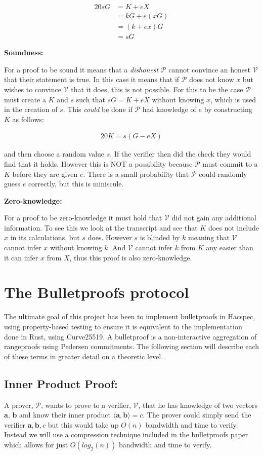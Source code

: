 \documentclass{article}
\newcommand{\eq}[1]{\begin{alignat*}{20}#1\end{alignat*}}
\renewcommand{\vec}[1]{\boldsymbol{#1}}
\newcommand{\V}{\mathcal{V}}
\renewcommand{\P}{\mathcal{P}}
\newcommand{\dotp}[2]{\langle #1, #2 \rangle}
\begin{document}
\eq{
	sG &= K + eX \\
	   &= kG + e(xG) \\
	   &= (k + ex)G \\
	   &= sG
}

\textbf{Soundness:}

For a proof to be sound it means that a \textit{dishonest} $\P$
cannot convince an honest $\V$ that their statement is true. In this
case it means that if $\P$ does not know $x$ but wishes to convince
$\V$ that it does, this is not possible. For this to be the case $\P$
must create a $K$ and $s$ such that $sG = K + eX$ without knowing $x$,
which is used in the creation of $s$. This \textit{could} be done if
$\P$ had knowledge of $e$ by constructing $K$ as follows:

\eq{
	K = s(G - eX)
}

and then choose a random value $s$. If the verifier then did the check
they would find that it holds. However this is NOT a possibility
because $\P$ must commit to a $K$ before they are given $e$. There
is a small probability that $\P$ could randomly guess $e$ correctly,
but this is miniscule.

\textbf{Zero-knowledge:}

For a proof to be zero-knowledge it must hold that $\V$ did not gain any additional information. To see this we look at the transcript and see that $K$ does not include $x$ in its calculations, but $s$ does. However $s$ is blinded by $k$ meaning that $\V$ cannot infer $x$ without knowing $k$. And $\V$ cannot infer $k$ from $K$ any easier than it can infer $x$ from $X$, thus this proof is also zero-knowledge. 

\section{The Bulletproofs protocol} \label{Bulletproofs}

The ultimate goal of this project has been to implement bulletproofs in
Hacspec, using property-based testing to ensure it is equivalent to the
implementation done in Rust, using Curve25519. A bulletproof is a
non-interactive aggregation of rangeproofs using Pedersen commitments.
The following section will describe each of these terms in greater detail
on a theoretic level.

\subsection{Inner Product Proof:}
A prover, $\P$, wants to prove to a verifier, $\V$, that he has knowledge
of two vectors $\vec{a}$, $\vec{b}$ and know their inner product
$\dotp{\vec{a}}{\vec{b}} = c$. The prover could simply send the verifier
$\vec{a}, \vec{b}, c$ but this would take up $O(n)$ bandwidth and
time to verify. Instead we will use a compression technique included
in the bulletproofs paper which allows for just $O(log_2(n))$ bandwidth
and time to verify.
\end{document}
